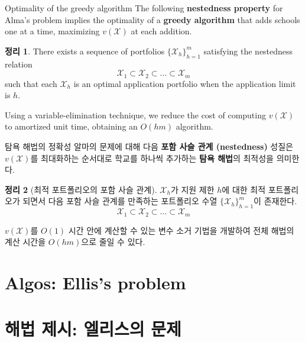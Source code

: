 \documentclass[11pt,mathserif,notheorems]{beamer}
\newtheorem{theorem}{Theorem}
\theoremstyle{definition}
\newtheorem{theorem}{정리}
\theoremstyle{definition}
\begin{document}
\ifen
\begin{frame}{Optimality of the greedy algorithm}
The following \textbf{nestedness property} for Alma's problem implies the optimality of a \textbf{greedy algorithm} that adds schools one at a time, maximizing $v(\mathcal{X})$ at each addition.
\begin{theorem}\label{nestedapplication}
There exists a sequence of portfolios $\{\mathcal{X}_h\}_{h=1}^m$ satisfying the nestedness relation
\begin{equation*}
\mathcal{X}_1 \subset \mathcal{X}_2\subset \dots \subset \mathcal{X}_m
\end{equation*}
such that each $\mathcal{X}_h$ is an optimal application portfolio when the application limit is $h$.
\end{theorem}

Using a variable-elimination technique, we reduce the cost of computing $v(\mathcal{X})$ to amortized unit time, obtaining an $O(hm)$ algorithm.
\end{frame}
\else
\begin{frame}{탐욕 해법의 정확성}
알마의 문제에 대해 다음 \textbf{포함 사슬 관계 (nestedness)} 성질은 $v(\mathcal{X})$를 최대화하는 순서대로 학교를 하나씩 추가하는 \textbf{탐욕 해법}의 최적성을 의미한다.
\begin{theorem}[최적 포트폴리오의 포함 사슬 관계] \label{nestedapplication}
$\mathcal{X}_h$가 지원 제한 $h$에 대한 최적 포트폴리오가 되면서 다음 포함 사슬 관계를 만족하는 포트폴리오 수열  $\{\mathcal{X}_h\}_{h=1}^m$이 존재한다.
\begin{equation*}
\mathcal{X}_1 \subset \mathcal{X}_2\subset \dots \subset \mathcal{X}_m
\end{equation*}
\end{theorem}

$v(\mathcal{X})$를 $O(1)$ 시간 안에 계산할 수 있는 변수 소거 기법을 개발하여 전체 해법의 계산 시간을 $O(hm)$으로 줄일 수 있다. 
\end{frame}
\fi






\ifen \section{Algos: Ellis's problem} \else \section{해법 제시: 엘리스의 문제} \fi
\end{document}
